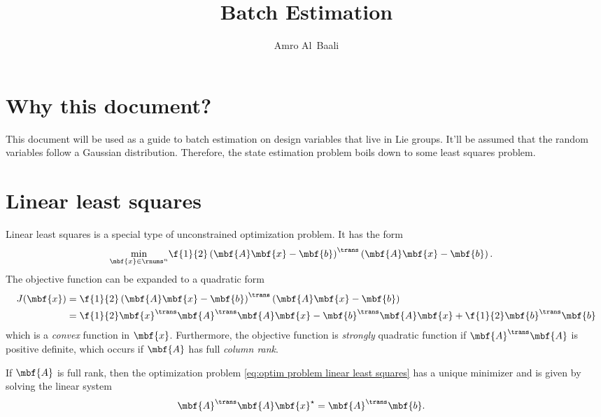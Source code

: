\documentclass[ nobib, nofonts, notoc]{tufte-handout}
\title{Batch Estimation}
\author{Amro Al~Baali}
\begin{document}
    {    
        
        \tableofcontents
        \clearpage
    }

    \section{Why this document?}
    This document will be used as a guide to batch estimation on design variables that live in Lie groups. It'll be assumed that the random variables follow a Gaussian distribution. Therefore, the state estimation problem boils down to some least squares problem.

    \section{Linear least squares}
    Linear least squares is a special type of unconstrained optimization problem. It has the form
    \begin{align}
        \label{eq:optim problem linear least squares}
        \min_{\mbf{x}\in\rnums^{n}} 
        &\f{1}{2}\left( \mbf{A} \mbf{x} - \mbf{b} \right)^{\trans}\left( \mbf{A}\mbf{x} - \mbf{b} \right).
    \end{align}
    The objective function can be expanded to a quadratic form
    \begin{align}
        J(\mbf{x}) 
        &= \f{1}{2}\left( \mbf{A} \mbf{x} - \mbf{b} \right)^{\trans}\left( \mbf{A}\mbf{x} - \mbf{b} \right)\\
        &= \f{1}{2}\mbf{x}^{\trans}\mbf{A}^{\trans}\mbf{A}\mbf{x} - \mbf{b}^{\trans}\mbf{A}\mbf{x} + \f{1}{2}\mbf{b}^{\trans}\mbf{b}
    \end{align}
    which is a \emph{convex} function in $\mbf{x}$. Furthermore, the objective function is \emph{strongly} quadratic function if $\mbf{A}^{\trans}\mbf{A}$ is positive definite, which occurs if $\mbf{A}$ has full \emph{column rank}. 

    If $\mbf{A}$ is full rank, then the optimization problem \eqref{eq:optim problem linear least squares} has a unique minimizer and is given by solving the linear system
    \begin{align}
        \label{eq:linear least squares normal equations}
        \mbf{A}^{\trans}\mbf{A}\mbf{x}^{\star} &= \mbf{A}^{\trans}\mbf{b}.
    \end{align}
\end{document}
